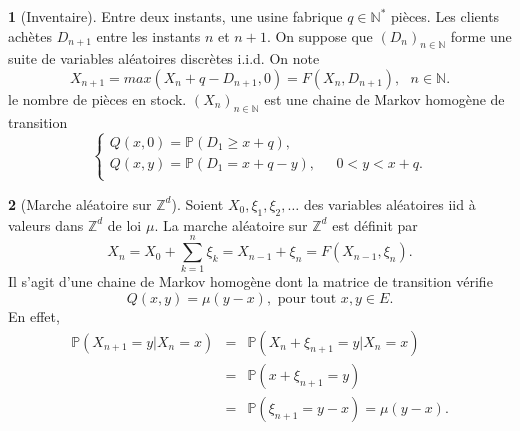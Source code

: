 \documentclass[8pt,notheorems]{beamer}
\def \N{\mathbb N}
\def \P {\mathbb P}
\theoremstyle{definition}
\theoremstyle{example}
\newtheorem{example}{\translate{Exemple}}
\theoremstyle{mystyle}
\theoremstyle{plain}
\begin{document}
 \begin{frame}[allowframebreaks]
\begin{example}[Inventaire]
Entre deux instants, une usine fabrique $q\in\N^{\ast}$ pièces. Les clients achètes $D_{n+1}$ entre les instants $n$ et $n+1$. On suppose que $(D_n)_{n\in\N}$ forme une suite de variables aléatoires discrètes i.i.d. On note
$$
X_{n+1}=max(X_n+q-D_{n+1},0)=F(X_n,D_{n+1}), \text{ }n\in\N.
$$
le nombre de pièces en stock. $(X_n)_{n\in\N}$ est une chaine de Markov homogène de transition
$$
\begin{cases}
Q(x,0)=\mathbb{P}(D_1\geq x+q),&\\
Q(x,y)=\mathbb{P}(D_1=x+q-y),&\text{ }0<y<x+q.\\
\end{cases}
$$
\end{example}
\begin{example}[Marche aléatoire sur $\mathbb{Z}^d$]
Soient $X_0, \xi_1, \xi_2,\ldots$ des variables aléatoires iid à valeurs dans $\mathbb{Z}^d$ de loi $\mu$. La marche aléatoire sur $\mathbb{Z}^d$ est définit par
$$
X_{n} = X_0 + \sum_{k = 1}^{n}\xi_k = X_{n-1} + \xi_n = F(X_{n-1} , \xi_n).
$$
Il s'agit d'une chaine de Markov homogène dont la matrice de transition vérifie
$$
Q(x,y) = \mu(y-x),\text{ pour tout }x,y\in E.
$$
En effet,
\begin{eqnarray*}
\P(X_{n+1} = y|X_{n} = x) &=& \P(X_n + \xi_{n+1} = y |X_{n} = x)\\
&=& \P(x + \xi_{n+1} = y)\\
&=&\P( \xi_{n+1} = y-x) = \mu(y-x).
\end{eqnarray*}
\end{example}
\end{frame}
\end{document}
